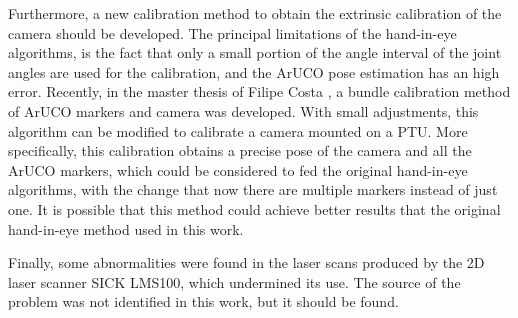 Furthermore, a new calibration method to obtain the extrinsic calibration of the camera should be developed. The principal limitations of the hand-in-eye algorithms, is the fact that only a small portion of the angle interval of the joint angles are used for the calibration, and the ArUCO pose estimation has an high error. Recently, in the master thesis of Filipe Costa \cite{costa18}, a bundle calibration method of ArUCO markers and camera was developed. With small adjustments, this algorithm can be modified to calibrate a camera mounted on a PTU. More specifically, this calibration obtains a precise pose of the camera and all the ArUCO markers, which could be considered to fed the original hand-in-eye algorithms, with the change that now there are multiple markers instead of just one. It is possible that this method could achieve better results that the original hand-in-eye method used in this work.

Finally, some abnormalities were found in the laser scans produced by the 2D laser scanner SICK LMS100, which undermined its use. The source of the problem was not identified in this work, but it should be found. 